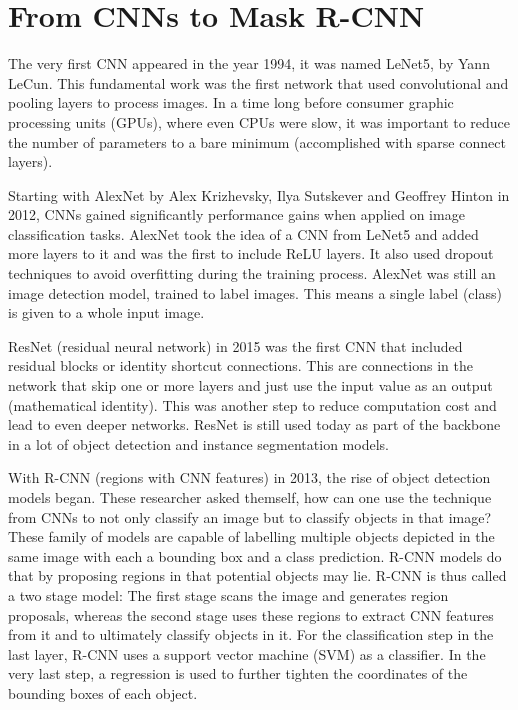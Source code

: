 \section{From CNNs to Mask R-CNN}

The very first CNN  appeared in the year 1994, it was named LeNet5, by Yann LeCun. This fundamental work was the first network that used convolutional and pooling layers to process images. In a time long before consumer graphic processing units (GPUs), where even CPUs were slow, it was important to reduce the number of parameters to a bare minimum (accomplished with sparse connect layers).

Starting with AlexNet by Alex Krizhevsky, Ilya Sutskever and Geoffrey Hinton in 2012, CNNs gained significantly performance gains when applied on image classification tasks. AlexNet took the idea of a CNN from LeNet5 and added more layers to it and was the first to include ReLU layers. It also used dropout techniques to avoid overfitting during the training process. AlexNet was still an image detection model, trained to label images. This means a single label (class) is given to a whole input image.

ResNet (residual neural network) in 2015 was the first CNN that included residual blocks or identity shortcut connections. This are connections in the network that skip one or more layers and just use the input value as an output (mathematical identity). This was another step to reduce computation cost and lead to even deeper networks. ResNet is still used today as part of the backbone in a lot of object detection and instance segmentation models.

With R-CNN (regions with CNN features) in 2013, the rise of object detection models began. These researcher asked themself, how can one use the technique from CNNs to not only classify an image but to classify objects in that image?  These family of models are capable of labelling multiple objects depicted in the same image with each a bounding box and a class prediction. R-CNN models do that by proposing regions in that potential objects may lie. R-CNN is thus called a two stage model: The first stage scans the image and generates region proposals, whereas the second stage uses these regions to extract CNN features from it and to ultimately classify objects in it. For the classification step in the last layer, R-CNN uses a support vector machine (SVM) as a classifier. In the very last step, a regression is used to further tighten the coordinates of the bounding boxes of each object.


